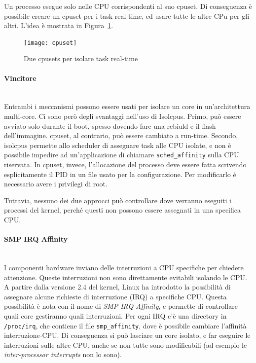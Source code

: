 Un processo esegue solo nelle CPU corrispondenti al suo cpuset. Di conseguenza è possibile creare un cpuset per i task real-time, ed usare tutte le altre CPu per gli altri. L'idea è mostrata in Figura~\ref{fig:cpuset}.
\begin{figure}[h]
	\centering
	\texttt{[image: cpuset]}
	\caption{Due cpusets per isolare task real-time}
	\label{fig:cpuset}
\end{figure}

\paragraph{Vincitore} \mbox{} \\
Entrambi i meccanismi possono essere usati per isolare un core in un'architettura multi-core. Ci sono però degli svantaggi nell'uso di Isolcpus. Primo, può essere avviato solo durante il boot, spesso dovendo fare una rebiuld e il flash dell'immagine. cpuset, al contrario, può essere cambiato a run-time. Secondo, isolcpus permette allo scheduler di assegnare task alle CPU isolate, e non è possibile impedire ad un'applicazione di chiamare \texttt{sched\_affinity} sulla CPU riservata. In cpuset, invece, l'allocazione del processo deve essere fatta scrivendo esplicitamente il PID in un file usato per la configurazione. Per modificarlo è necessario avere i privilegi di root.

Tuttavia, nessuno dei due approcci può controllare dove verranno eseguiti i processi del kernel, perché questi non possono essere assegnati in una specifica CPU.

\paragraph{SMP IRQ Affinity} \mbox{} \\
I componenti hardware inviano delle interruzioni a CPU specifiche per chiedere attenzione. Queste interruzioni non sono direttamente evitabili isolando le CPU. A partire dalla versione 2.4 del kernel, Linux ha introdotto la possibilità di assegnare alcune richieste di interruzione (IRQ) a specifiche CPU. Questa possibilità è nota con il nome di \textit{SMP IRQ Affinity}, e permette di controllare quali core gestiranno quali interruzioni. Per ogni IRQ c'è una directory in \texttt{/proc/irq}, che contiene il file \texttt{smp\_affinity}, dove è possibile cambiare l'affinità interruzione-CPU. Di conseguenza si può lasciare un core isolato, e far eseguire le interruzioni sulle altre CPU, anche se non tutte sono modificabili (ad esempio le \textit{inter-processor interrupts} non lo sono).

